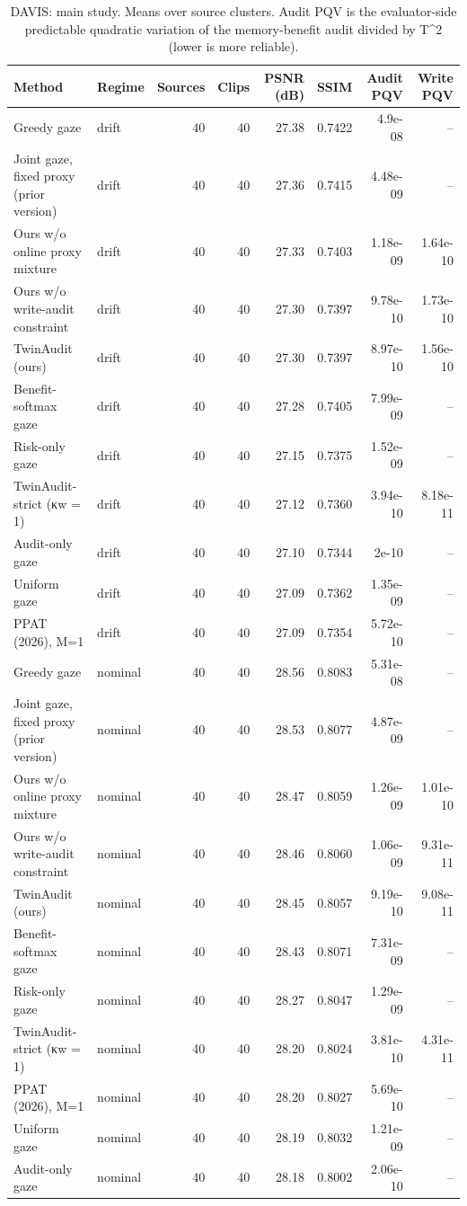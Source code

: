 \begin{table}[t]
\centering
\caption{DAVIS: main study. Means over source clusters. Audit PQV is the evaluator-side predictable quadratic variation of the memory-benefit audit divided by T^2 (lower is more reliable).}
\label{tab:main_DAVIS}
\small
\begin{tabular}{llrrrrrr}
\toprule
Method & Regime & Sources & Clips & PSNR (dB) & SSIM & Audit PQV & Write PQV \\
\midrule
Greedy gaze & drift & 40 & 40 & 27.38 & 0.7422 & 4.9e-08 & -- \\
Joint gaze, fixed proxy (prior version) & drift & 40 & 40 & 27.36 & 0.7415 & 4.48e-09 & -- \\
Ours w/o online proxy mixture & drift & 40 & 40 & 27.33 & 0.7403 & 1.18e-09 & 1.64e-10 \\
Ours w/o write-audit constraint & drift & 40 & 40 & 27.30 & 0.7397 & 9.78e-10 & 1.73e-10 \\
TwinAudit (ours) & drift & 40 & 40 & 27.30 & 0.7397 & 8.97e-10 & 1.56e-10 \\
Benefit-softmax gaze & drift & 40 & 40 & 27.28 & 0.7405 & 7.99e-09 & -- \\
Risk-only gaze & drift & 40 & 40 & 27.15 & 0.7375 & 1.52e-09 & -- \\
TwinAudit-strict (κw = 1) & drift & 40 & 40 & 27.12 & 0.7360 & 3.94e-10 & 8.18e-11 \\
Audit-only gaze & drift & 40 & 40 & 27.10 & 0.7344 & 2e-10 & -- \\
Uniform gaze & drift & 40 & 40 & 27.09 & 0.7362 & 1.35e-09 & -- \\
PPAT (2026), M=1 & drift & 40 & 40 & 27.09 & 0.7354 & 5.72e-10 & -- \\
Greedy gaze & nominal & 40 & 40 & 28.56 & 0.8083 & 5.31e-08 & -- \\
Joint gaze, fixed proxy (prior version) & nominal & 40 & 40 & 28.53 & 0.8077 & 4.87e-09 & -- \\
Ours w/o online proxy mixture & nominal & 40 & 40 & 28.47 & 0.8059 & 1.26e-09 & 1.01e-10 \\
Ours w/o write-audit constraint & nominal & 40 & 40 & 28.46 & 0.8060 & 1.06e-09 & 9.31e-11 \\
TwinAudit (ours) & nominal & 40 & 40 & 28.45 & 0.8057 & 9.19e-10 & 9.08e-11 \\
Benefit-softmax gaze & nominal & 40 & 40 & 28.43 & 0.8071 & 7.31e-09 & -- \\
Risk-only gaze & nominal & 40 & 40 & 28.27 & 0.8047 & 1.29e-09 & -- \\
TwinAudit-strict (κw = 1) & nominal & 40 & 40 & 28.20 & 0.8024 & 3.81e-10 & 4.31e-11 \\
PPAT (2026), M=1 & nominal & 40 & 40 & 28.20 & 0.8027 & 5.69e-10 & -- \\
Uniform gaze & nominal & 40 & 40 & 28.19 & 0.8032 & 1.21e-09 & -- \\
Audit-only gaze & nominal & 40 & 40 & 28.18 & 0.8002 & 2.06e-10 & -- \\
\bottomrule
\end{tabular}
\end{table}
